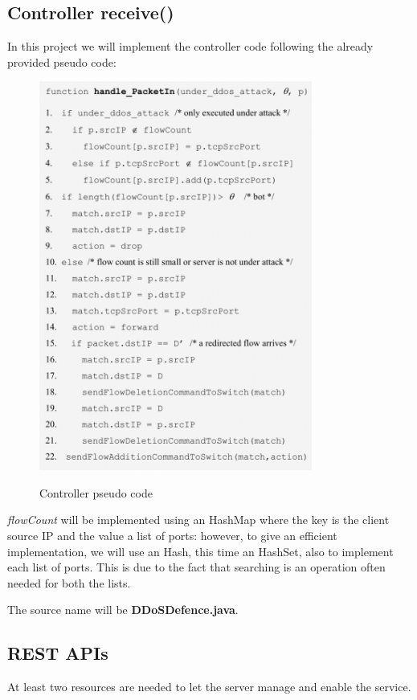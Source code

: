 \subsection{Controller receive()}
In this project we will implement the controller code following the already provided pseudo code:
\begin{figure}[H]
\begin{center}
\includegraphics[width=0.8\textwidth]{images/PseudoCode.png}
\label{fig:pseudocode}
\caption{Controller pseudo code}
\end{center}
\end{figure}

\textit{flowCount} will be implemented using an HashMap where the key is the client source IP and the value a list of ports: however, to give an efficient implementation, we will use an Hash, this time an HashSet, also to implement each list of ports. This is due to the fact that searching is an operation often needed for both the lists.

The source name will be \textbf{DDoSDefence.java}.

\subsection{REST APIs}
At least two resources are needed to let the server manage and enable the service.

